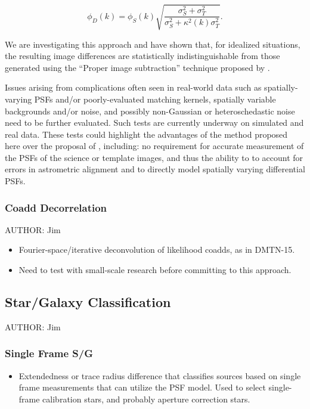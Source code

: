 \begin{equation}
  \phi_D(k) = \phi_S(k) \sqrt{\frac{\sigma_S^2+\sigma_T^2}{\sigma_S^2 + \kappa^2(k)\sigma_T^2}}.
\end{equation}

We are investigating this approach and have shown that, for idealized situations, the resulting image differences are statistically indistinguishable from those generated using the ``Proper image subtraction'' technique proposed by \cite{Zackay16}.

Issues arising from complications often seen in real-world data such as spatially-varying PSFs and/or poorly-evaluated matching kernels, spatially variable backgrounds and/or noise, and possibly non-Gaussian or heteroschedastic noise need to be further evaluated. Such tests are currently underway on simulated and real data. These tests could highlight the advantages of the method proposed here over the proposal of \cite{Zackay16}, including: no requirement for accurate measurement of the PSFs of the science or template images, and thus the ability to to account for errors in astrometric alignment and to directly model spatially varying differential PSFs.

\subsubsection{Coadd Decorrelation}
\label{sec:acCoaddDecorrelation}
AUTHOR: Jim
\begin{itemize}
\item Fourier-space/iterative deconvolution of likelihood coadds, as in DMTN-15.
\item Need to test with small-scale research before committing to this approach.
\end{itemize}

\subsection{Star/Galaxy Classification}
\label{sec:acClassification}
AUTHOR: Jim
\subsubsection{Single Frame S/G}
\label{sec:acSingleFrameClassification}
\begin{itemize}
\item Extendedness or trace radius difference that classifies sources based on single frame measurements that can utilize the PSF model.  Used to select single-frame calibration stars, and probably aperture correction stars.
\end{itemize}
